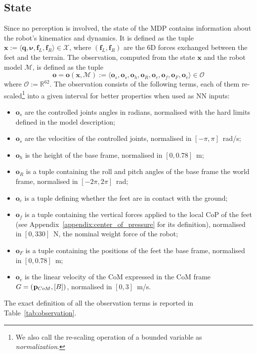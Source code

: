 \pagebreak
\begin{addmargin}{0cm}

\subsection{State}

Since no perception is involved, the state of the \ac{MDP} contains information about the robot's kinematics and dynamics.
It is defined as the tuple $\mathbf{x} := \langle \mathbf{q}, \mathbf{\boldsymbol{\nu}}, \mathbf{f}_L, \mathbf{f}_R \rangle \in \mathcal{X}$, where $(\mathbf{f}_L, \mathbf{f}_R)$ are the 6D forces exchanged between the feet and the terrain.
The observation, computed from the state $\mathbf{x}$ and the robot model $\mathcal{M}$, is defined as the tuple
%
\begin{equation*}
    \boldsymbol{o} =
    \boldsymbol{o}(\mathbf{x}, \mathcal{M}) :=
    \langle \mathbf{o}_s, \mathbf{o}_{\dot{s}}, \mathbf{o}_h, \mathbf{o}_R, \mathbf{o}_c, \mathbf{o}_f, \mathbf{o}_F, \mathbf{o}_v \rangle \in \mathcal{O}
\end{equation*}
%
where $\mathcal{O} := \mathbb{R}^{62}$.
%
The observation consists of the following terms, each of them re-scaled\footnote{We also call the re-scaling operation of a bounded variable as \emph{normalization}.} into a given interval for better properties when used as \ac{NN} inputs:
%
\begin{itemize}
%
\item $\mathbf{o}_s$ are the controlled joints angles in radians, normalised with the hard limits defined in the model description; 
%
\item $\mathbf{o}_{\dot{s}}$ are the velocities of the controlled joints, normalised in $[-\pi, \pi]$~rad/s;
%
\item $\mathbf{o}_h$ is the height of the base frame, normalised in $[0, 0.78]$~m;
%
\item $\mathbf{o}_R$ is a tuple containing the roll and pitch angles of the base frame \wrt the world frame, normalised in $[-2\pi, 2\pi]$~rad;
%
\item $\mathbf{o}_c$ is a tuple defining whether the feet are in contact with the ground;
%
\item $\mathbf{o}_f$ is a tuple containing the vertical forces applied to the local \ac{CoP} of the feet (see Appendix~\ref{appendix:center_of_pressure} for its definition), normalised in $[0, 330]$~N, \ie the nominal weight force of the robot;
%
\item $\mathbf{o}_F$ is a tuple containing the positions of the feet \wrt the base frame, normalised in $[0, 0.78]$~m;
%
\item $\mathbf{o}_v$ is the linear velocity of the \ac{CoM} expressed in the \ac{CoM} frame $G = (\prescript{}{}{\mathbf{p}}_{CoM}, [B])$, normalised in $[0, 3]$~m/s.
%
\end{itemize}
%
The exact definition of all the observation terms is reported in Table~\ref{tab:observation}.


\end{addmargin}
